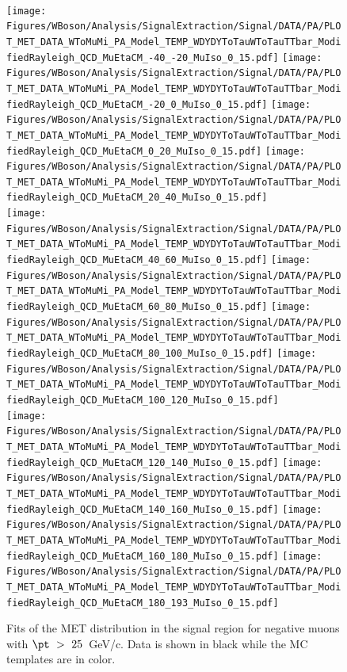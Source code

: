 \begin{figure}[!h]
\begin{center}
\begin{tiny}
\\
\texttt{[image: Figures/WBoson/Analysis/SignalExtraction/Signal/DATA/PA/PLOT\_MET\_DATA\_WToMuMi\_PA\_Model\_TEMP\_WDYDYToTauWToTauTTbar\_ModifiedRayleigh\_QCD\_MuEtaCM\_-40\_-20\_MuIso\_0\_15.pdf]}
\texttt{[image: Figures/WBoson/Analysis/SignalExtraction/Signal/DATA/PA/PLOT\_MET\_DATA\_WToMuMi\_PA\_Model\_TEMP\_WDYDYToTauWToTauTTbar\_ModifiedRayleigh\_QCD\_MuEtaCM\_-20\_0\_MuIso\_0\_15.pdf]}
\texttt{[image: Figures/WBoson/Analysis/SignalExtraction/Signal/DATA/PA/PLOT\_MET\_DATA\_WToMuMi\_PA\_Model\_TEMP\_WDYDYToTauWToTauTTbar\_ModifiedRayleigh\_QCD\_MuEtaCM\_0\_20\_MuIso\_0\_15.pdf]}
\texttt{[image: Figures/WBoson/Analysis/SignalExtraction/Signal/DATA/PA/PLOT\_MET\_DATA\_WToMuMi\_PA\_Model\_TEMP\_WDYDYToTauWToTauTTbar\_ModifiedRayleigh\_QCD\_MuEtaCM\_20\_40\_MuIso\_0\_15.pdf]}
\\
\texttt{[image: Figures/WBoson/Analysis/SignalExtraction/Signal/DATA/PA/PLOT\_MET\_DATA\_WToMuMi\_PA\_Model\_TEMP\_WDYDYToTauWToTauTTbar\_ModifiedRayleigh\_QCD\_MuEtaCM\_40\_60\_MuIso\_0\_15.pdf]}
\texttt{[image: Figures/WBoson/Analysis/SignalExtraction/Signal/DATA/PA/PLOT\_MET\_DATA\_WToMuMi\_PA\_Model\_TEMP\_WDYDYToTauWToTauTTbar\_ModifiedRayleigh\_QCD\_MuEtaCM\_60\_80\_MuIso\_0\_15.pdf]}
\texttt{[image: Figures/WBoson/Analysis/SignalExtraction/Signal/DATA/PA/PLOT\_MET\_DATA\_WToMuMi\_PA\_Model\_TEMP\_WDYDYToTauWToTauTTbar\_ModifiedRayleigh\_QCD\_MuEtaCM\_80\_100\_MuIso\_0\_15.pdf]}
\texttt{[image: Figures/WBoson/Analysis/SignalExtraction/Signal/DATA/PA/PLOT\_MET\_DATA\_WToMuMi\_PA\_Model\_TEMP\_WDYDYToTauWToTauTTbar\_ModifiedRayleigh\_QCD\_MuEtaCM\_100\_120\_MuIso\_0\_15.pdf]}
\\
\texttt{[image: Figures/WBoson/Analysis/SignalExtraction/Signal/DATA/PA/PLOT\_MET\_DATA\_WToMuMi\_PA\_Model\_TEMP\_WDYDYToTauWToTauTTbar\_ModifiedRayleigh\_QCD\_MuEtaCM\_120\_140\_MuIso\_0\_15.pdf]}
\texttt{[image: Figures/WBoson/Analysis/SignalExtraction/Signal/DATA/PA/PLOT\_MET\_DATA\_WToMuMi\_PA\_Model\_TEMP\_WDYDYToTauWToTauTTbar\_ModifiedRayleigh\_QCD\_MuEtaCM\_140\_160\_MuIso\_0\_15.pdf]}
\texttt{[image: Figures/WBoson/Analysis/SignalExtraction/Signal/DATA/PA/PLOT\_MET\_DATA\_WToMuMi\_PA\_Model\_TEMP\_WDYDYToTauWToTauTTbar\_ModifiedRayleigh\_QCD\_MuEtaCM\_160\_180\_MuIso\_0\_15.pdf]}
\texttt{[image: Figures/WBoson/Analysis/SignalExtraction/Signal/DATA/PA/PLOT\_MET\_DATA\_WToMuMi\_PA\_Model\_TEMP\_WDYDYToTauWToTauTTbar\_ModifiedRayleigh\_QCD\_MuEtaCM\_180\_193\_MuIso\_0\_15.pdf]}
\end{tiny}
\caption{Fits of the MET distribution in the signal region for negative muons with $\pt~>~25$~GeV/c. Data is shown in black while the MC templates are in color.}
\label{fig:METFits_WToMuMi_PA}
\end{center}
\end{figure}


